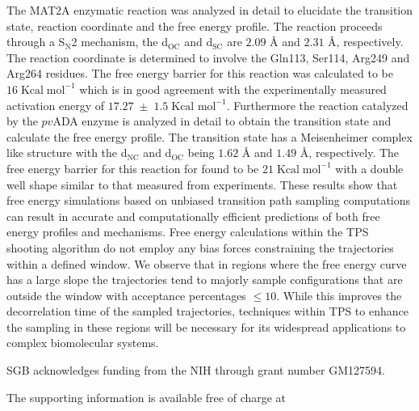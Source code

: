\documentclass[journal=jpcbfk,manuscript=article,layout=traditional]{achemso}
\begin{document}
The MAT2A enzymatic reaction was analyzed in detail to elucidate the transition state,
reaction coordinate and the free energy profile. The reaction proceeds through a 
S$_\text{N}$2 mechanism, the d$_{\text{OC}}$ and d$_{\text{SC}}$ are $2.09$ {\AA}
and $2.31$ {\AA}, respectively. The reaction coordinate is determined to involve  
the Gln113, Ser114, Arg249 and Arg264 residues. 
The free energy barrier for this reaction was calculated to be 
$16\;\text{Kcal}\;\text{mol}^{-1}$ which is in good agreement 
with the experimentally measured activation energy of $17.27\;\pm\;1.5\;\text{Kcal mol}^{-1}$. 
Furthermore the reaction catalyzed by the $pv$ADA enzyme is analyzed in detail to obtain the  
transition state and calculate the free energy profile.
The transition state has a Meisenheimer complex like structure with the 
d$_\text{NC}$ and d$_\text{OC}$ being $1.62$ {\AA} and $1.49$ {\AA}, respectively.
The free energy barrier for this reaction for found to be $21\;\text{Kcal}\;\text{mol}^{-1}$
with a double well shape similar to that measured from experiments. 
These results show that free energy simulations based on unbiased transition 
path sampling computations can result in accurate and computationally
efficient predictions of both free energy profiles and mechanisms.
Free energy calculations within the TPS shooting algorithm do not employ any 
bias forces constraining the trajectories within a defined window. 
We observe that in regions where the free energy curve has a large 
slope the trajectories tend to majorly sample configurations that are 
outside the window with acceptance percentages $\leq 10$. While this improves
the decorrelation time of the sampled trajectories, techniques within 
TPS to enhance the sampling in these regions will be necessary for its
widespread applications to complex biomolecular systems.  
\begin{acknowledgement}
SGB acknowledges funding from the NIH through grant number GM127594.
\end{acknowledgement}

\begin{suppinfo}
The supporting information is available free of charge at



\end{suppinfo}


\end{document}

